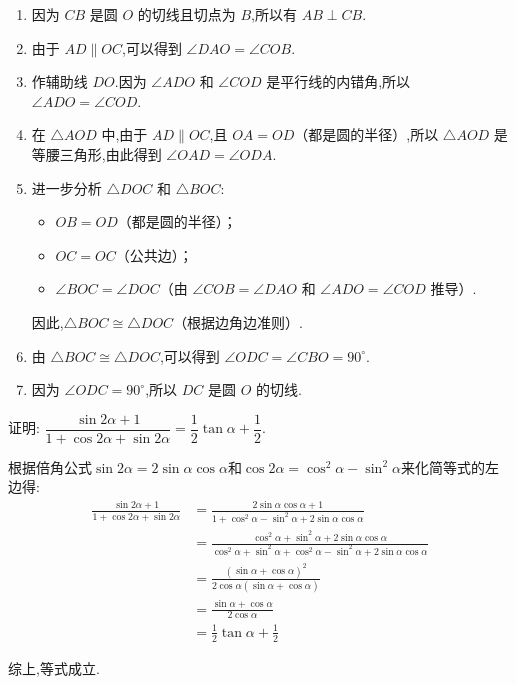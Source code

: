 \begin{questions}
	\begin{solution}
		\begin{enumerate}[label=\arabic*.]
			\item 因为 $CB$ 是圆 $O$ 的切线且切点为 $B$,所以有 $AB \perp CB$.
			\item 由于 $AD \parallel OC$,可以得到 $\angle DAO = \angle COB$.
			\item 作辅助线 $DO$.因为 $\angle ADO$ 和 $\angle COD$ 是平行线的内错角,所以 $\angle ADO = \angle COD$.
			\item 在 $\triangle AOD$ 中,由于 $AD \parallel OC$,且 $OA = OD$（都是圆的半径）,所以 $\triangle AOD$ 是等腰三角形,由此得到 $\angle OAD = \angle ODA$.
			\item 进一步分析 $\triangle DOC$ 和 $\triangle BOC$:
			      \begin{itemize}
				      \item $OB = OD$（都是圆的半径）；
				      \item $OC = OC$（公共边）；
				      \item $\angle BOC = \angle DOC$（由 $\angle COB = \angle DAO$ 和 $\angle ADO = \angle COD$ 推导）.
			      \end{itemize}
			      因此,$\triangle BOC \cong \triangle DOC$（根据边角边准则）.
			\item 由 $\triangle BOC \cong \triangle DOC$,可以得到 $\angle ODC = \angle CBO = 90^\circ$.
			\item 因为 $\angle ODC = 90^\circ$,所以 $DC$ 是圆 $O$ 的切线.
		\end{enumerate}
	\end{solution}

	\question 证明: $\dfrac{\sin2\alpha + 1}{1+\cos2\alpha + \sin2\alpha} = \dfrac12\tan\alpha + \dfrac12$.
	\begin{mathenum}
		\item 根据倍角公式$\sin2\alpha = 2\sin\alpha\cos\alpha$和$\cos2\alpha=\cos^2\alpha -
			\sin^2\alpha$来化简等式的左边得:
		\begin{align*}
			\frac{\sin2\alpha + 1}{1+\cos2\alpha + \sin2\alpha}
			 & = \frac{2\sin\alpha\cos\alpha + 1}{1 + \cos^2\alpha - \sin^2\alpha + 2\sin\alpha\cos\alpha} \\
			 & = \frac{\cos^2\alpha + \sin^2\alpha + 2\sin\alpha\cos\alpha}{\cos^2\alpha + \sin^2\alpha +
			\cos^2\alpha - \sin^2\alpha + 2\sin\alpha\cos\alpha}                                           \\
			 & = \frac{(\sin\alpha + \cos\alpha)^2}{2\cos\alpha(\sin\alpha + \cos\alpha)}                  \\
			 & = \frac{\sin\alpha + \cos\alpha}{2\cos\alpha}                                               \\
			 & = \frac12\tan\alpha + \frac12
		\end{align*}
		\item 综上,等式成立.
	\end{mathenum}


\end{questions}

